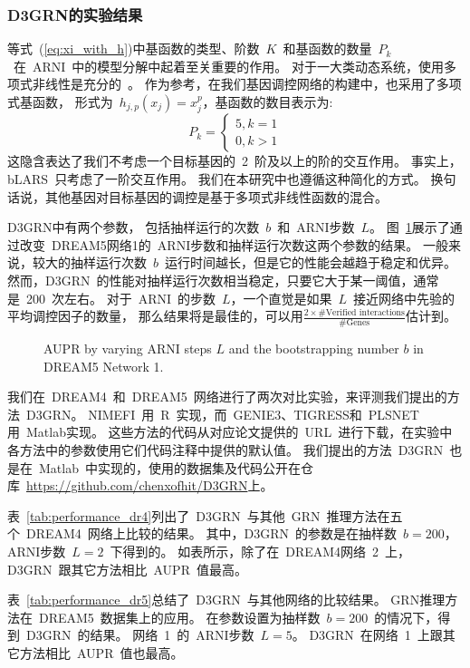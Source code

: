 \subsubsection{D3GRN的实验结果}
等式~(\ref{eq:xi_with_h})中基函数的类型、阶数~$K$~和基函数的数量~$P_k$~在~ARNI~中的模型分解中起着至关重要的作用。
对于一大类动态系统，使用多项式非线性是充分的~\cite{mangan2016inferring}。
作为参考，在我们基因调控网络的构建中，也采用了多项式基函数，
形式为~$h_{j,p}(x_j)=x_j^p$，基函数的数目表示为: 
\begin{equation}
P_k=\left\{\begin{matrix}
5,  k=1\\ 
0,  k>1
\end{matrix}\right. 
\end{equation}
这隐含表达了我们不考虑一个目标基因的~2~阶及以上的阶的交互作用。
事实上，bLARS~\cite{singh2016blars}只考虑了一阶交互作用。
我们在本研究中也遵循这种简化的方式。
换句话说，其他基因对目标基因的调控是基于多项式非线性函数的混合。

D3GRN中有两个参数，
包括抽样运行的次数~$b$~和~ARNI步数~$L$。
图~\ref{fig:performance_dr5}展示了通过改变~DREAM5网络1的~ARNI步数和抽样运行次数这两个参数的结果。
一般来说，较大的抽样运行次数~$b$~运行时间越长，但是它的性能会越趋于稳定和优异。
然而，D3GRN~的性能对抽样运行次数相当稳定，只要它大于某一阈值，通常是~200~次左右。
对于~ARNI~的步数~$L$，一个直觉是如果~$L$~接近网络中先验的平均调控因子的数量，
那么结果将是最佳的，可以用$\frac{2  \times \#\text{Verified interactions}}{\#\text{Genes}}$估计到。
 
\begin{figure}[!htbp]
\centering

\caption{AUPR by varying ARNI steps $L$ and the bootstrapping number $b$ in DREAM5  Network 1.}
\label{fig:performance_dr5}
\end{figure}

我们在~DREAM4~和~DREAM5~网络进行了两次对比实验，来评测我们提出的方法~D3GRN。
NIMEFI~用~R~实现，而~GENIE3、TIGRESS和~PLSNET用~Matlab实现。
这些方法的代码从对应论文提供的~URL~进行下载，在实验中各方法中的参数使用它们代码注释中提供的默认值。
我们提出的方法~D3GRN~也是在~Matlab~中实现的，使用的数据集及代码公开在仓库~\url{https://github.com/chenxofhit/D3GRN}上。

表~\ref{tab:performance_dr4}列出了~D3GRN~与其他~GRN~推理方法在五个~DREAM4~网络上比较的结果。
其中，D3GRN~的参数是在抽样数~$b=200$，ARNI步数~$L=2$~下得到的。
如表所示，除了在~DREAM4网络~2~上，D3GRN~跟其它方法相比~AUPR~值最高。

表~\ref{tab:performance_dr5}总结了~D3GRN~与其他网络的比较结果。
GRN推理方法在~DREAM5~数据集上的应用。
在参数设置为抽样数~$b=200$~的情况下，得到~D3GRN~的结果。
网络~1~的~ARNI步数~$L=5$。
D3GRN~在网络~1~上跟其它方法相比~AUPR~值也最高。

